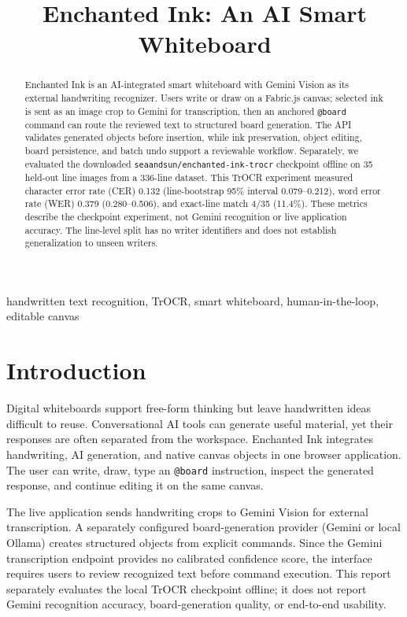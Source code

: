 \documentclass[conference]{IEEEtran}
\title{Enchanted Ink: An AI Smart Whiteboard}
\author{\IEEEauthorblockN{Arjun C and Anvita Dey}
\IEEEauthorblockA{Electrical and Electronics Department\\
Amrita Vishwa Vidyapeetham\\
Arjun C: AM.EN.U4EEE24016; Anvita Dey: AM.EN.U4EEE24014}}
\begin{document}
\maketitle

\begin{abstract}
Enchanted Ink is an AI-integrated smart whiteboard with Gemini Vision as its external handwriting recognizer. Users write or draw on a Fabric.js canvas; selected ink is sent as an image crop to Gemini for transcription, then an anchored \texttt{@board} command can route the reviewed text to structured board generation. The API validates generated objects before insertion, while ink preservation, object editing, board persistence, and batch undo support a reviewable workflow. Separately, we evaluated the downloaded \texttt{seaandsun/enchanted-ink-trocr} checkpoint offline on 35 held-out line images from a 336-line dataset. This TrOCR experiment measured character error rate (CER) 0.132 (line-bootstrap 95\% interval 0.079--0.212), word error rate (WER) 0.379 (0.280--0.506), and exact-line match 4/35 (11.4\%). These metrics describe the checkpoint experiment, not Gemini recognition or live application accuracy. The line-level split has no writer identifiers and does not establish generalization to unseen writers.
\end{abstract}

\begin{IEEEkeywords}
handwritten text recognition, TrOCR, smart whiteboard, human-in-the-loop, editable canvas
\end{IEEEkeywords}

\section{Introduction}
Digital whiteboards support free-form thinking but leave handwritten ideas difficult to reuse. Conversational AI tools can generate useful material, yet their responses are often separated from the workspace. Enchanted Ink integrates handwriting, AI generation, and native canvas objects in one browser application. The user can write, draw, type an \texttt{@board} instruction, inspect the generated response, and continue editing it on the same canvas.

The live application sends handwriting crops to Gemini Vision for external transcription. A separately configured board-generation provider (Gemini or local Ollama) creates structured objects from explicit commands. Since the Gemini transcription endpoint provides no calibrated confidence score, the interface requires users to review recognized text before command execution. This report separately evaluates the local TrOCR checkpoint offline; it does not report Gemini recognition accuracy, board-generation quality, or end-to-end usability.
\end{document}
